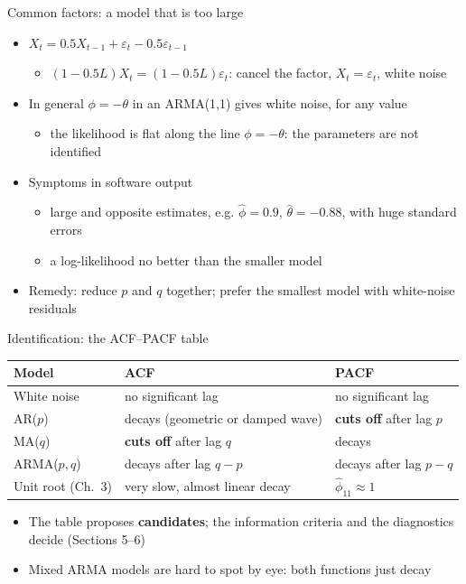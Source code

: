 \begin{frame}{Common factors: a model that is too large}
\itemsize{\small}
\begin{itemize}
    \item $X_t = 0.5X_{t-1} + \varepsilon_t - 0.5\varepsilon_{t-1}$
    \begin{itemize}
        \item $(1 - 0.5L)X_t = (1 - 0.5L)\varepsilon_t$: cancel the factor, $X_t = \varepsilon_t$, white noise
    \end{itemize}
    \item In general $\phi = -\theta$ in an ARMA(1,1) gives white noise, for any value
    \begin{itemize}
        \item the likelihood is flat along the line $\phi = -\theta$: the parameters are not identified
    \end{itemize}
    \item Symptoms in software output
    \begin{itemize}
        \item large and opposite estimates, e.g. $\hat\phi = 0.9$, $\hat\theta = -0.88$, with huge standard errors
        \item a log-likelihood no better than the smaller model
    \end{itemize}
    \item Remedy: reduce $p$ and $q$ together; prefer the smallest model with white-noise residuals
\end{itemize}
\end{frame}

\begin{frame}{Identification: the ACF--PACF table}
\itemsize{\small}
\begin{center}
\footnotesize
\begin{tabular}{lll}
\toprule
\textbf{Model} & \textbf{ACF} & \textbf{PACF} \\
\midrule
White noise & no significant lag & no significant lag \\
AR($p$) & decays (geometric or damped wave) & \textbf{cuts off} after lag $p$ \\
MA($q$) & \textbf{cuts off} after lag $q$ & decays \\
ARMA($p,q$) & decays after lag $q - p$ & decays after lag $p - q$ \\
Unit root (Ch.~3) & very slow, almost linear decay & $\hat\phi_{11} \approx 1$ \\
\bottomrule
\end{tabular}
\end{center}
\begin{itemize}
    \item The table proposes \textbf{candidates}; the information criteria and the diagnostics decide (Sections 5--6)
    \item Mixed ARMA models are hard to spot by eye: both functions just decay
\end{itemize}
\end{frame}

